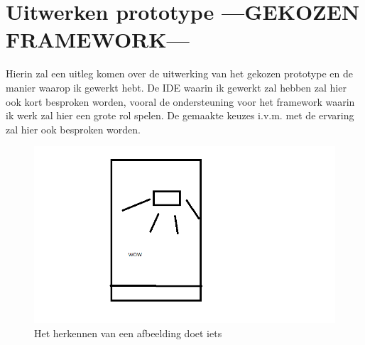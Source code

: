 \chapter{Uitwerken prototype ---GEKOZEN FRAMEWORK---}
\label{ch:prototype}

Hierin zal een uitleg komen over de uitwerking van het gekozen prototype en de manier waarop ik gewerkt hebt. De IDE waarin ik gewerkt zal hebben zal hier ook kort besproken worden, vooral de ondersteuning voor het framework waarin ik werk zal hier een grote rol spelen.
De gemaakte keuzes i.v.m. met de ervaring zal hier ook besproken worden.
\begin{figure}
    \includegraphics[width=\textwidth]{img/wow}\caption{Het herkennen van een afbeelding doet iets}\label{fig:imgreg1}
\end{figure}